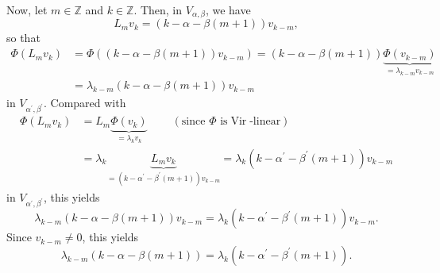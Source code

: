 \documentclass[etingof-lie.tex]{subfiles}
\begin{document}
Now, let $m\in\mathbb{Z}$ and $k\in\mathbb{Z}$. Then, in $V_{\alpha,\beta}$,
we have%
\[
L_{m}v_{k}=\left(  k-\alpha-\beta\left(  m+1\right)  \right)  v_{k-m},
\]
so that%
\begin{align*}
\Phi\left(  L_{m}v_{k}\right)   &  =\Phi\left(  \left(  k-\alpha-\beta\left(
m+1\right)  \right)  v_{k-m}\right)  =\left(  k-\alpha-\beta\left(
m+1\right)  \right)  \underbrace{\Phi\left(  v_{k-m}\right)  }_{=\lambda
_{k-m}v_{k-m}}\\
&  =\lambda_{k-m}\left(  k-\alpha-\beta\left(  m+1\right)  \right)  v_{k-m}%
\end{align*}
in $V_{\alpha^{\prime},\beta^{\prime}}$. Compared with%
\begin{align*}
\Phi\left(  L_{m}v_{k}\right)   &  =L_{m}\underbrace{\Phi\left(  v_{k}\right)
}_{=\lambda_{k}v_{k}}\ \ \ \ \ \ \ \ \ \ \left(  \text{since }\Phi\text{ is
}\operatorname*{Vir}\text{-linear}\right) \\
&  =\lambda_{k}\underbrace{L_{m}v_{k}}_{=\left(  k-\alpha^{\prime}%
-\beta^{\prime}\left(  m+1\right)  \right)  v_{k-m}}=\lambda_{k}\left(
k-\alpha^{\prime}-\beta^{\prime}\left(  m+1\right)  \right)  v_{k-m}%
\end{align*}
in $V_{\alpha^{\prime},\beta^{\prime}}$, this yields%
\[
\lambda_{k-m}\left(  k-\alpha-\beta\left(  m+1\right)  \right)  v_{k-m}%
=\lambda_{k}\left(  k-\alpha^{\prime}-\beta^{\prime}\left(  m+1\right)
\right)  v_{k-m}.
\]
Since $v_{k-m}\neq0$, this yields%
\begin{equation}
\lambda_{k-m}\left(  k-\alpha-\beta\left(  m+1\right)  \right)  =\lambda
_{k}\left(  k-\alpha^{\prime}-\beta^{\prime}\left(  m+1\right)  \right)  .
\label{pf.Vab.iso.5a}%
\end{equation}
\end{document}
